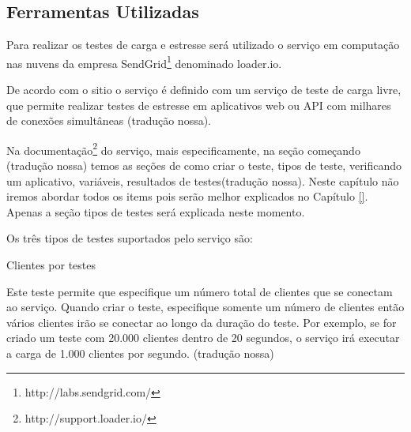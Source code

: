 




\subsection{Ferramentas Utilizadas}
\label{ferramentas-utilizadas-para-testes}
  
  Para realizar os testes de carga e estresse será utilizado o serviço em computação nas nuvens
  da empresa SendGrid\footnote{http://labs.sendgrid.com/} denominado loader.io.
  
  De acordo com o sitio o serviço é definido com um serviço de teste de carga livre,
  que permite realizar testes de estresse em aplicativos web ou \ac{API} com milhares de conexões simultâneas
  (tradução nossa).
  
  Na documentação\footnote{http://support.loader.io/} do serviço, mais especificamente, na seção começando (tradução nossa)
  temos as seções de como criar o teste, tipos de teste, verificando um aplicativo, variáveis,
  resultados de testes(tradução nossa). Neste capítulo não iremos abordar todos os items pois serão melhor explicados
  no Capítulo \ref{}. Apenas a seção tipos de testes será explicada neste momento.
  
  Os três tipos de testes suportados pelo serviço são:
  
  Clientes por testes
  
  Este teste permite que especifique um número total de clientes que se conectam ao serviço. Quando criar o teste,
  especifique somente um número de clientes então vários clientes irão se conectar ao longo da duração do teste. 
  Por exemplo, se for criado um teste com 20.000 clientes dentro de 20 segundos, o serviço irá executar a carga de 
  1.000 clientes por segundo. (tradução nossa)
  
